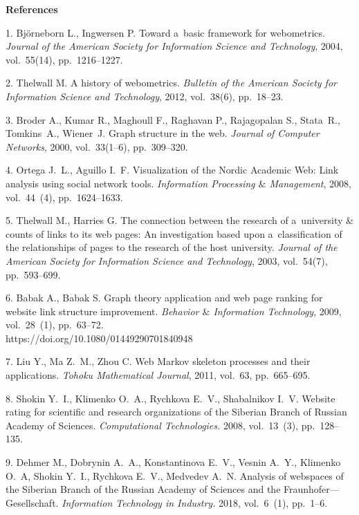
{\small

\vskip1.5mm%

\noindent \textbf{References} }

\vskip 1.5mm%

{\footnotesize

1. Bj\"{o}rneborn L., Ingwersen P. Toward a~basic framework for
webometrics. \emph{Journal of the American Society for Information
Science and Technology}, 2004, vol.~55(14), pp.~1216--1227.

2. Thelwall M. A history of webometrics. \emph{Bulletin of the
American Society for Information Science and Technology}, 2012,
vol.~38(6), pp.~18--23.

3. Broder A., Kumar R., Maghoull F., Raghavan P., Rajagopalan S.,
Stata~R., Tomkins~A., Wiener~J. Graph structure in the web.
\emph{Journal of Computer Networks}, 2000, vol.~33(1--6),
pp.~309--320.

4. Ortega J.~L., Aguillo I.~F. Visualization of the Nordic
Academic Web: Link analysis using social network tools.
\emph{Information Processing $\&$ Management}, 2008, vol.~44~(4),
pp.~1624--1633.

5. Thelwall M., Harries G. The connection between the research of
a~university \& counts of links to its web pages: An investigation
based upon a~classification of the relationships of pages to the
research of the host university. \emph{Journal of the American
Society for Information Science and Technology}, 2003, vol.~54(7),
pp.~593--699.

6. Babak A., Babak S. Graph theory application and web page
ranking for website link structure improvement. \emph{Behavior
$\&$ Information Technology}, 2009, vol.~28~(1), pp.~63--72.\\
https://doi.org/10.1080/01449290701840948

7. Liu Y., Ma Z.~M., Zhou C. Web Markov skeleton processes and
their applications. \emph{Tohoku Mathematical Journal}, 2011,
vol.~63, pp.~665--695.

8. Shokin Y.~I., Klimenko O.~A., Rychkova E.~V., Shabalnikov I.~V.
Website rating for scientific and research organizations of the
Siberian Branch of Russian Academy of Sciences.
\emph{Computational Technologies.} 2008, vol.~13~(3),
pp.~128--135.

9. Dehmer M., Dobrynin A.~A., Konstantinova E.~V., Vesnin A.~Y.,
Klimenko O.~A, Shokin Y.~I., Rychkova E.~V., Medvedev A.~N.
Analysis of webspaces of the Siberian Branch of the Russian
Academy of Sciences and the Fraunhofer---Gesellschaft.
\emph{Information Technology in Industry.} 2018, vol.~6~(1),
pp.~1--6.

}
